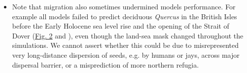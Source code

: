 \documentclass[pdflatex, sn-nature]{sn-jnl}%
\begin{document}
\begin{itemize}
\item Note that migration also sometimes undermined models performance. For example all models failed to predict deciduous \emph{Quercus} in the British Isles before the Early Holocene sea level rise and the opening of the Strait of Dover (\hyperref[quercus_migration]{Fig. 2} and \cite{Smith2011}), even though the land-sea mask changed throughout the simulations. We cannot assert whether this could be due to misrepresented very long-distance dispersion of seeds, e.g. by humans or jays, across major dispersal barrier, or a misprediction of more northern refugia.


\end{itemize}
\end{document}
